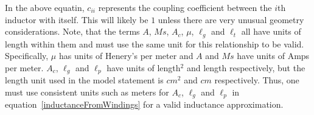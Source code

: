 In the above equatin, $c_{ii}$ represents the coupling coefficient between the $i$th inductor with itself.  
This will likely be $1$ unless there are very unusual geometry considerations.  Note, that the terms $A$, $Ms$, $A_c$, $\mu$,
$\ell_{g}$ and $\ell_{t}$ all have units of length within them and must use the same unit for this relationship 
to be valid.  Specifically, $\mu$ has units of Henery's per meter and $A$ and $Ms$ have units of Amps per meter.   
$A_c$, $\ell_{g}$ and $\ell_{p}$ have units of length$^2$ and length respectively, but the length unit used in 
the model statement is $cm^2$ and $cm$ respectively.  Thus, one must use consistent units such as meters 
for $A_c$, $\ell_{g}$ and $\ell_{p}$ in equation~\ref{inductanceFromWindings} for a valid inductance approximation.

